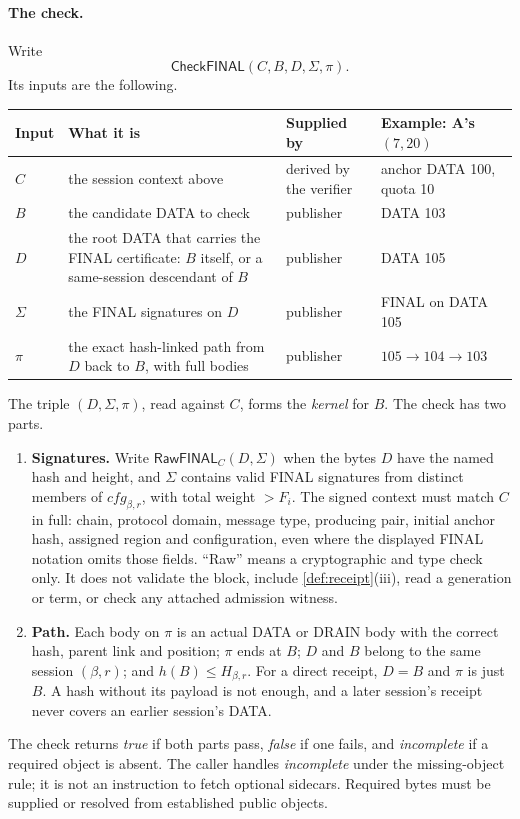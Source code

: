 \documentclass[11pt,a4paper]{article}
\newcommand{\tagg}[1]{\ensuremath{\mathsf{#1}}}
\newcommand{\defterm}[1]{\textcolor{rrBlue}{\textit{#1}}}
\newcounter{protocol}
\begin{document}
\paragraph{The check.}
Write
\[
 \tagg{CheckFINAL}(C,B,D,\Sigma,\pi).
\]
Its inputs are the following.
\begin{center}\small
\begin{tabularx}{\linewidth}{@{}>{\raggedright\arraybackslash}p{.05\linewidth}Y>{\raggedright\arraybackslash}p{.15\linewidth}>{\raggedright\arraybackslash}p{.22\linewidth}@{}}\toprule
Input & What it is & Supplied by & Example: A's $(7,20)$\\\midrule
$C$ & the session context above & derived by the verifier & anchor DATA 100, quota 10\\
$B$ & the candidate DATA to check & publisher & DATA 103\\
$D$ & the root DATA that carries the FINAL certificate: $B$ itself, or a same-session descendant of $B$ & publisher & DATA 105\\
$\Sigma$ & the FINAL signatures on $D$ & publisher & FINAL on DATA 105\\
$\pi$ & the exact hash-linked path from $D$ back to $B$, with full bodies & publisher & $105\to104\to103$\\\bottomrule
\end{tabularx}
\end{center}
The triple $(D,\Sigma,\pi)$, read against $C$, forms the \defterm{kernel} for $B$.
The check has two parts.
\begin{enumerate}[label=(\arabic*),itemsep=2pt]
\item \textbf{Signatures.} Write $\tagg{RawFINAL}_C(D,\Sigma)$ when the
bytes $D$ have the named hash and height, and $\Sigma$ contains valid
FINAL signatures from distinct members of $\mathit{cfg}_{\beta,r}$, with total
weight $>F_i$. The signed context must match $C$ in full: chain,
protocol domain, message type, producing pair, initial anchor hash,
assigned region and configuration, even where the displayed FINAL
notation omits those fields. ``Raw'' means a cryptographic and type check only. It does not
validate the block, include \cref{def:receipt}(iii), read a generation
or term, or check any attached admission witness.
\item \textbf{Path.} Each body on $\pi$ is an actual DATA or DRAIN body
with the correct hash, parent link and position; $\pi$ ends at $B$; $D$
and $B$ belong to the same session $(\beta,r)$; and
$h(B)\le H_{\beta,r}$. For a direct receipt, $D=B$ and $\pi$ is just $B$.
A hash without its payload is not enough, and a later session's receipt
never covers an earlier session's DATA.
\end{enumerate}
The check returns \emph{true} if both parts pass, \emph{false} if one
fails, and \emph{incomplete} if a required object is absent. The caller
handles \emph{incomplete} under the missing-object rule; it is not an
instruction to fetch optional sidecars. Required bytes must be supplied
or resolved from established public objects.
\end{document}
